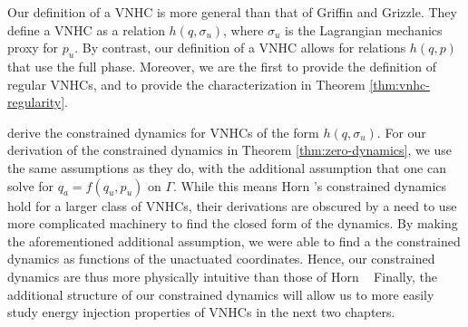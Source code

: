 Our definition of a VNHC is more general than that of Griffin and
Grizzle.
They define a VNHC as a relation \(h(q,\sigma_u)\), where \(\sigma_u\) is the
Lagrangian mechanics proxy for \(p_u\).
By contrast, our definition of a VNHC allows for relations \(h(q,p)\)
that use the full phase.
Moreover, we are the first to provide the definition of regular VNHCs, and to
provide the characterization in Theorem \ref{thm:vnhc-regularity}.

\citet{hybrid_zero_dynamics_bipedal_nhvcs} derive the
constrained dynamics for VNHCs of the form \(h(q,\sigma_u)\).
For our derivation of the constrained dynamics in Theorem
\ref{thm:zero-dynamics}, we use the same assumptions as they do, with the
additional assumption that one can solve for \(q_a = f(q_u,p_u)\) on \(\Gamma\).
While this means Horn \etal's constrained dynamics hold for a larger class of VNHCs, 
their derivations are obscured by a need to use more complicated machinery
to find the closed form of the dynamics. 
By making the aforementioned additional assumption, we were able to find a the constrained
dynamics as functions of the unactuated coordinates.
Hence, our constrained dynamics are thus more physically intuitive than those of
Horn \etal~%
Finally, the additional structure of our constrained dynamics will allow us to
more easily study energy injection properties of VNHCs in the next two chapters.

